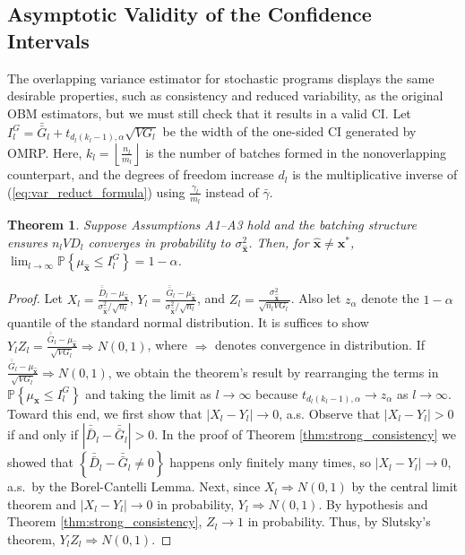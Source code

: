 \documentclass[12pt]{article}
\newtheorem{theorem}{Theorem}
\newcommand{\p}[1]{\mathbb{P} \left\{ #1 \right\}}
\newcommand{\x}{\mathbf{x}}
\newcommand{\xh}{{\hat{\x}}}
\newcommand{\xs}{\x^*}
\newcommand{\gammab}{\bar{\gamma}}
\newcommand{\gb}{\bar{G}}
\newcommand{\gbb}{\bar{\gb}}
\newcommand{\db}{\bar{D}}
\newcommand{\dbb}{\bar{\db}}
\begin{document}
\subsection{Asymptotic Validity of the Confidence Intervals}
\label{ssec:validity}

The overlapping variance estimator for stochastic programs displays the same desirable properties, such as consistency and reduced variability, as the original OBM estimators, but we must still check that it results in a valid CI.  
Let $I^G_l = \gbb_l + t_{d_l \left( k_l-1\right),\alpha} \sqrt{VG_l}$ be the width of the one-sided CI generated by OMRP. 
Here, $k_l= \left\lfloor\frac{n_l}{m_l}\right\rfloor $ is the number of batches formed in the nonoverlapping counterpart, and the degrees of freedom increase $d_l$ is the multiplicative inverse of (\ref{eq:var_reduct_formula}) using $\frac{\gamma_l}{m_l}$ instead of $\gammab$.

\begin{theorem} \label{thm:conf_int}
	Suppose Assumptions A1--A3 hold and the batching structure ensures $n_l VD_l$ converges in probability to $\sigma^2_\xh$.  
        Then, for $\xh \neq \xs$, $\lim_{l\rightarrow\infty} \p{\mu_\xh \leq I^G_l} = 1 - \alpha$.
\end{theorem}

\begin{proof} 
			Let $X_l = \frac{\dbb_l - \mu_\xh}{\sigma^2_\xh/\sqrt{n_l}}$, $Y_l = \frac{\gbb_l - \mu_\xh}{\sigma^2_\xh/\sqrt{n_l}}$, and $Z_l = \frac{\sigma^2_\xh}{\sqrt{n_lVG_l}}$. 
			Also let $z_{\alpha}$ denote the $1-\alpha$ quantile of the standard normal distribution. 
        It is suffices to show $Y_lZ_l = \frac{\gbb_l - \mu_\xh}{\sqrt{VG_l}} \Rightarrow N(0,1)$, where $\Rightarrow$ denotes convergence in distribution.
			If $\frac{\gbb_l - \mu_\xh}{\sqrt{VG_l}} \Rightarrow N(0,1)$, we obtain the theorem's result by rearranging the terms in $\p{\mu_\xh \leq I^G_l}$ and taking the limit as $l \rightarrow \infty$ because $t_{d_l(k_l -1),\alpha} \rightarrow z_{\alpha}$ as $l \rightarrow \infty$.
        Toward this end, we first show that $|X_l - Y_l| \rightarrow 0$, a.s.  
		  Observe that $|X_l - Y_l| > 0$ if and only if $|\dbb_l - \gbb_l| > 0$.  
        In the proof of Theorem \ref{thm:strong_consistency} we showed that $\left\{ \dbb_l - \gbb_l \neq 0 \right\}$ happens only finitely many times, so $|X_l - Y_l| \rightarrow 0$, a.s.\ by the Borel-Cantelli Lemma. 
        Next, since $X_l \Rightarrow N(0,1)$  by the central limit theorem and $|X_l - Y_l| \rightarrow 0$ in probability, $Y_l \Rightarrow N(0,1)$.  
        By hypothesis and Theorem \ref{thm:strong_consistency}, $Z_l \rightarrow 1$ in probability.  
        Thus, by Slutsky's theorem, $Y_lZ_l \Rightarrow N(0,1)$.
\end{proof}
\end{document}
